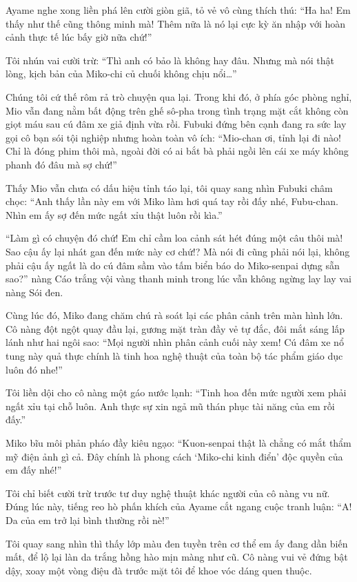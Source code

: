 \documentclass[../main.tex]{subfiles}
\begin{document}
Ayame nghe xong liền phá lên cười giòn giã, tỏ vẻ vô cùng thích thú:
``Ha ha! Em thấy như thế cũng thông minh mà! Thêm nữa là nó lại cực kỳ ăn nhập với hoàn cảnh thực tế lúc bấy giờ nữa chứ!''

Tôi nhún vai cười trừ:
``Thì anh có bảo là không hay đâu. Nhưng mà nói thật lòng, kịch bản của Miko-chi củ chuối không chịu nổi\dots''

Chúng tôi cứ thế rôm rả trò chuyện qua lại. Trong khi đó, ở phía góc phòng nghỉ, Mio vẫn đang nằm bất động trên ghế sô-pha trong tình trạng mặt cắt không còn giọt máu sau cú đâm xe giả định vừa rồi. Fubuki đứng bên cạnh đang ra sức lay gọi cô bạn sói tội nghiệp nhưng hoàn toàn vô ích:
``Mio-chan ơi, tỉnh lại đi nào! Chỉ là đóng phim thôi mà, ngoài đời có ai bắt bà phải ngồi lên cái xe máy không phanh đó đâu mà sợ chứ!''

Thấy Mio vẫn chưa có dấu hiệu tỉnh táo lại, tôi quay sang nhìn Fubuki châm chọc:
``Anh thấy lần này em với Miko làm hơi quá tay rồi đấy nhé, Fubu-chan. Nhìn em ấy sợ đến mức ngất xỉu thật luôn rồi kìa.''

``Làm gì có chuyện đó chứ! Em chỉ cầm loa cảnh sát hét đúng một câu thôi mà! Sao cậu ấy lại nhát gan đến mức này cơ chứ!? Mà nói đi cũng phải nói lại, không phải cậu ấy ngất là do cú đâm sầm vào tấm biển báo do Miko-senpai dựng sẵn sao?'' nàng Cáo trắng vội vàng thanh minh trong lúc vẫn không ngừng lay lay vai nàng Sói đen.

Cùng lúc đó, Miko đang chăm chú rà soát lại các phân cảnh trên màn hình lớn. Cô nàng đột ngột quay đầu lại, gương mặt tràn đầy vẻ tự đắc, đôi mắt sáng lấp lánh như hai ngôi sao:
``Mọi người nhìn phân cảnh cuối này xem! Cú đâm xe nổ tung này quả thực chính là tinh hoa nghệ thuật của toàn bộ tác phẩm giáo dục luôn đó nhe!''

Tôi liền dội cho cô nàng một gáo nước lạnh:
``Tinh hoa đến mức người xem phải ngất xỉu tại chỗ luôn. Anh thực sự xin ngả mũ thán phục tài năng của em rồi đấy.''

Miko bĩu môi phản pháo đầy kiêu ngạo:
``Kuon-senpai thật là chẳng có mắt thẩm mỹ điện ảnh gì cả. Đây chính là phong cách `Miko-chi kinh điển' độc quyền của em đấy nhé!''

Tôi chỉ biết cười trừ trước tư duy nghệ thuật khác người của cô nàng vu nữ. Đúng lúc này, tiếng reo hò phấn khích của Ayame cắt ngang cuộc tranh luận:
``A! Da của em trở lại bình thường rồi nè!''

Tôi quay sang nhìn thì thấy lớp màu đen tuyền trên cơ thể em ấy đang dần biến mất, để lộ lại làn da trắng hồng hào mịn màng như cũ. Cô nàng vui vẻ đứng bật dậy, xoay một vòng điệu đà trước mặt tôi để khoe vóc dáng quen thuộc.
\end{document}
